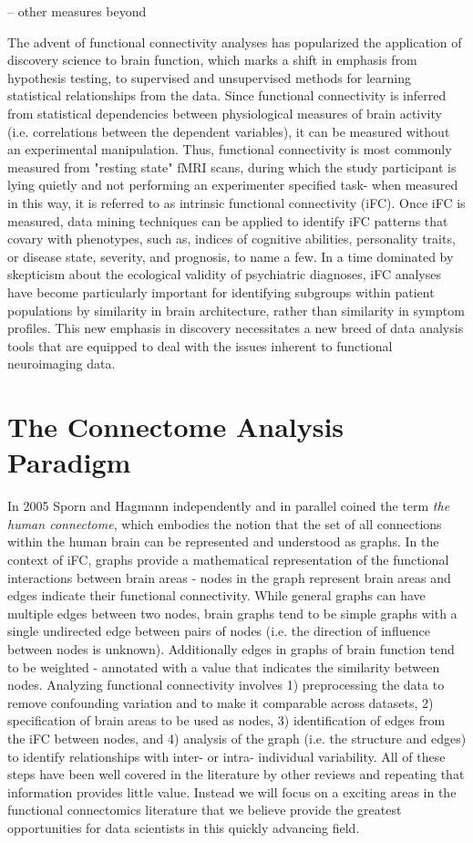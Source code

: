 -- other measures beyond 

The advent of functional connectivity analyses has popularized the application of discovery science to brain function, which marks a shift in emphasis from hypothesis testing, to supervised and unsupervised methods for learning statistical relationships from the data. Since functional connectivity is inferred from statistical dependencies between physiological measures of brain activity (i.e. correlations between the dependent variables), it can be measured without an experimental manipulation. Thus, functional connectivity is most commonly measured from "resting state" fMRI scans, during which the study participant is lying quietly and not performing an experimenter specified task- when measured in this way, it is referred to as intrinsic functional connectivity (iFC). Once iFC is measured, data mining techniques can be applied to identify iFC patterns that covary with phenotypes, such as, indices of cognitive abilities, personality traits, or disease state, severity, and prognosis, to name a few. In a time dominated by skepticism about the ecological validity of psychiatric diagnoses, iFC analyses have become particularly important for identifying subgroups within patient populations by similarity in brain architecture, rather than similarity in symptom profiles. This new emphasis in discovery necessitates a new breed of data analysis tools that are equipped to deal with the issues inherent to functional neuroimaging data.

\section{The Connectome Analysis Paradigm}

In 2005 Sporn and Hagmann \cite{Sporns2005,Hagmann2005} independently and in parallel coined the term \textit{the human connectome}, which embodies the notion that the set of all connections within the human brain can be represented and understood as graphs. In the context of iFC, graphs provide a mathematical representation of the functional interactions between brain areas -  nodes in the graph represent brain areas and edges indicate their functional connectivity. While general graphs can have multiple edges between two nodes, brain graphs tend to be simple graphs with a single undirected edge between pairs of nodes (i.e. the direction of influence between nodes is unknown). Additionally edges in graphs of brain function tend to be weighted - annotated with a value that indicates the similarity between nodes. Analyzing functional connectivity involves 1) preprocessing the data to remove confounding variation and to make it comparable across datasets, 2) specification of brain areas to be used as nodes, 3) identification of edges from the iFC between nodes, and 4) analysis of the graph (i.e. the structure and edges) to identify relationships with inter- or intra- individual variability. All of these steps have been well covered in the literature  by other reviews and repeating that information provides little value. Instead we will focus on a exciting areas in the functional connectomics literature that we believe provide the greatest opportunities for data scientists in this quickly advancing field.

